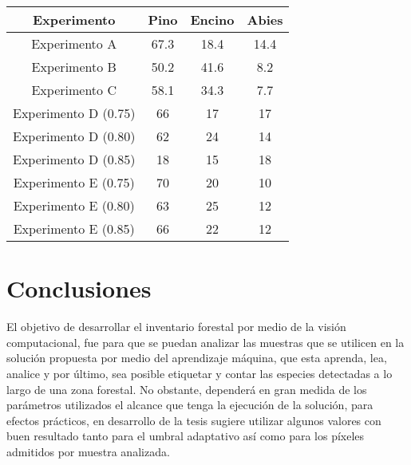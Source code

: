 \documentclass[a0,portrait]{a0poster}
\begin{document}
\begin{multicols}{2}
\begin{center}
\begin{tabular}{|c|c|c|c|}
			\hline
			 \textbf{Experimento} & \textbf{Pino} & \textbf{Encino} & \textbf{Abies}\\
			\hline
			Experimento A & 67.3 & 18.4 & 14.4\\
			\hline
			Experimento B & 50.2 & 41.6 & 8.2\\
			\hline
			Experimento C & 58.1 & 34.3 & 7.7\\
			\hline
			Experimento D (0.75) & 66 & 17 & 17\\
			\hline
			Experimento D (0.80) & 62 & 24 & 14\\
			\hline
			Experimento D (0.85) & 18 & 15 & 18\\
			\hline
			Experimento E (0.75) & 70 & 20 & 10\\
			\hline
			Experimento E (0.80) & 63 & 25 & 12\\
			\hline
			Experimento E (0.85) & 66 & 22 & 12\\
			\hline
		\end{tabular}
\end{center}

\vspace*{-5mm}
\section*{Conclusiones}
El objetivo de desarrollar el inventario forestal por medio de la visión computacional, fue para que se puedan analizar las muestras que se utilicen en la solución propuesta por medio del aprendizaje máquina, que esta aprenda, lea, analice y por último, sea posible etiquetar y contar las especies detectadas a lo largo de una zona forestal. No obstante, dependerá en gran medida de los parámetros utilizados el alcance que tenga la ejecución de la solución, para efectos prácticos, en desarrollo de la tesis sugiere utilizar algunos valores con buen resultado tanto para el umbral adaptativo así como para los píxeles admitidos por muestra analizada.



%

\end{multicols}
\end{document}
